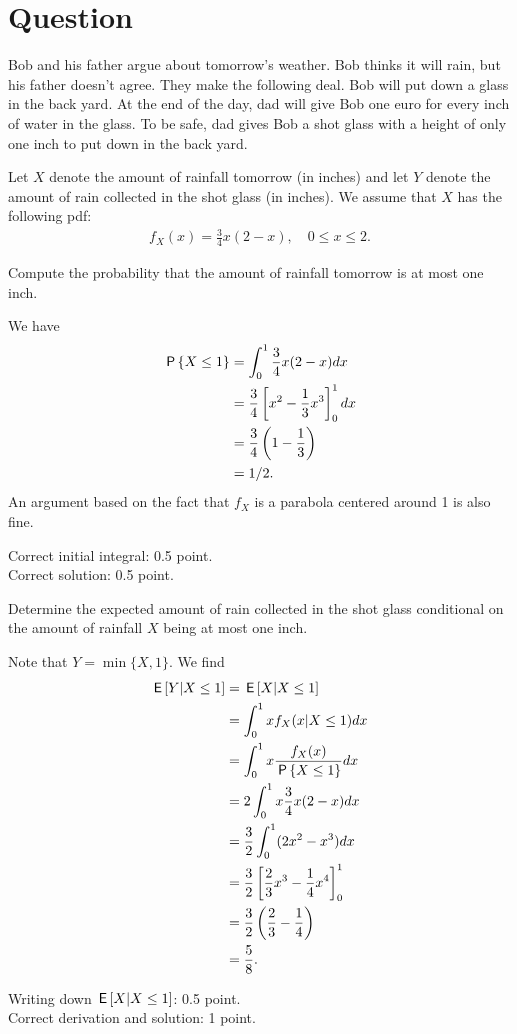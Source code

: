 \section{Question}

Bob and his father argue about tomorrow's weather. Bob thinks it will rain, but his father doesn't agree. They make the following deal. Bob will put down a glass in the back yard. At the end of the day, dad will give Bob one euro for every inch of water in the glass. To be safe, dad gives Bob a shot glass with a height of only one inch to put down in the back yard.

Let $X$ denote the amount of rainfall tomorrow (in inches) and let $Y$ denote the amount of rain collected in the shot glass (in inches). We assume that $X$ has the following pdf:
\begin{align}
    f_X(x) = \frac{3}{4}x(2-x), \quad 0 \leq x \leq 2.
\end{align}

\begin{exercise}[1]
Compute the probability that the amount of rainfall tomorrow is at most one inch.
\begin{solution}
We have
\begin{align}
    \P{X \leq 1} &= \int_0^1 \frac{3}{4} x (2-x) dx \\
    &=  \frac{3}{4}\left[ x^2 - \frac{1}{3} x^3 \right]_0^1 dx \\
    &=  \frac{3}{4}\left( 1 - \frac{1}{3} \right) \\
    &= 1/2.
\end{align}
An argument based on the fact that $f_X$ is a parabola centered around 1 is also fine.

Correct initial integral: 0.5 point.\\
Correct solution: 0.5 point.
\end{solution}
\end{exercise}

\begin{exercise}[1.5]
Determine the expected amount of rain collected in the shot glass conditional on the amount of rainfall $X$ being at most one inch.
\begin{solution}
Note that $Y = \min\{X,1\}$. We find
\begin{align}
    \E{Y|X\leq 1} &= \E{X|X\leq 1} \\
    &= \int_0^1 x f_X(x|X\leq 1) dx \\
    &= \int_0^1 x \frac{f_X(x)}{\P{X \leq 1}} dx \\
    &= 2 \int_0^1 x \frac{3}{4} x (2-x)  dx \\
    &= \frac{3}{2} \int_0^1 (2x^2 - x^3)  dx \\
    &= \frac{3}{2} \left[ \frac{2}{3} x^3 - \frac{1}{4} x^4\right]_0^1 \\
    &= \frac{3}{2} \left( \frac{2}{3} - \frac{1}{4} \right) \\
    &= \frac{5}{8}.
\end{align}

Writing down $\E{X|X\leq 1}$: 0.5 point.\\
Correct derivation and solution: 1 point.
\end{solution}
\end{exercise}

